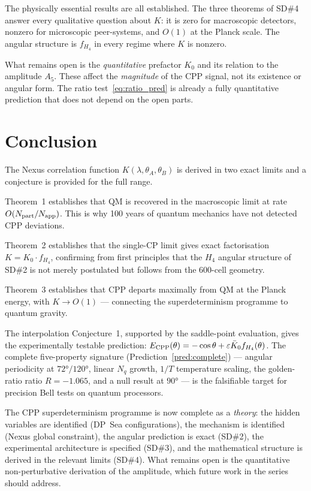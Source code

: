 \documentclass[11pt,a4paper]{article}
\newcommand{\eps}{\varepsilon}
\newcommand{\Napp}{N_{\rm app}}
\newcommand{\Npart}{N_{\rm part}}
\begin{document}
The physically essential results are all established.  The three
theorems of SD\#4 answer every qualitative question about $K$:
it is zero for macroscopic detectors, nonzero for microscopic
peer-systems, and $O(1)$ at the Planck scale.  The angular
structure is $f_{H_4}$ in every regime where $K$ is nonzero.

What remains open is the \emph{quantitative} prefactor $K_0$ and
its relation to the amplitude $A_5$.  These affect the
\emph{magnitude} of the CPP signal, not its existence or angular
form.  The ratio test~\eqref{eq:ratio_pred} is already a fully
quantitative prediction that does not depend on the open parts.

\section{Conclusion}

The Nexus correlation function $K(\lambda,\theta_A,\theta_B)$ is
derived in two exact limits and a conjecture is provided for the
full range.

Theorem~1 establishes that QM is recovered in the macroscopic
limit at rate $O(\Npart/\Napp)$.  This is why 100 years of quantum
mechanics have not detected CPP deviations.

Theorem~2 establishes that the single-CP limit gives exact
factorisation $K = K_0 \cdot f_{H_4}$, confirming from first
principles that the $H_4$ angular structure of SD\#2 is not merely
postulated but follows from the 600-cell geometry.

Theorem~3 establishes that CPP departs maximally from QM at the
Planck energy, with $K \to O(1)$ — connecting the superdeterminism
programme to quantum gravity.

The interpolation Conjecture~1, supported by the saddle-point
evaluation, gives the experimentally testable prediction:
$E_{\rm CPP}(\theta) = -\cos\theta + \eps\bar K_0 f_{H_4}(\theta)$.
The complete five-property signature (Prediction~\ref{pred:complete})
— angular periodicity at $72°/120°$, linear $N_q$ growth, $1/T$
temperature scaling, the golden-ratio ratio $R = -1.065$, and a
null result at $90°$ — is the falsifiable target for precision
Bell tests on quantum processors.

The CPP superdeterminism programme is now complete as a \emph{theory}:
the hidden variables are identified (DP~Sea configurations), the
mechanism is identified (Nexus global constraint), the angular
prediction is exact (SD\#2), the experimental architecture is
specified (SD\#3), and the mathematical structure is derived in
the relevant limits (SD\#4).  What remains open is the quantitative
non-perturbative derivation of the amplitude, which future work
in the series should address.
\end{document}
